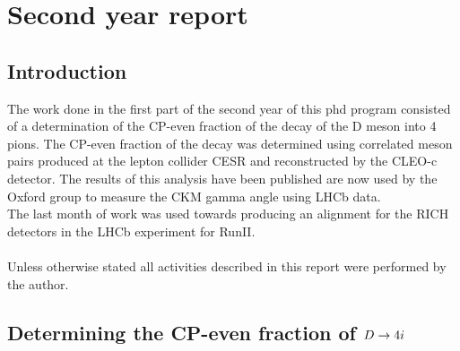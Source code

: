 \setcounter{chapter}{1}
\chapter*{Second year report}
\section{Introduction}
The work done in the first part of the second year of this phd program consisted of a determination of the CP-even fraction of the decay of the D meson into 4 pions. The CP-even fraction of the decay was determined using correlated \D meson pairs produced at the lepton collider CESR and reconstructed by the CLEO-c detector. The results of this analysis have been published are now used by the Oxford group to measure the CKM gamma angle using LHCb data. \\
The last month of work was used towards producing an alignment for the RICH detectors in the LHCb experiment for RunII.\\
\\
Unless otherwise stated all activities described in this report were performed by the author.\\

\section{Determining the CP-even fraction of $D \rightarrow 4i$}

